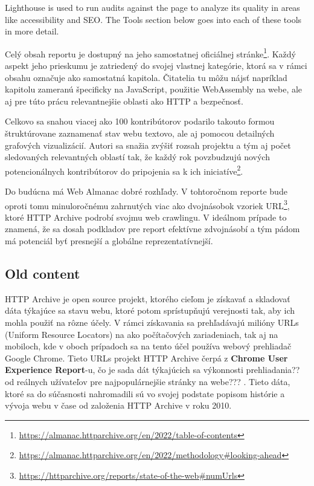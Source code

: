 {
Lighthouse is used to run audits against the page to analyze its quality in areas like accessibility and SEO. The Tools section below goes into each of these tools in more detail.

Celý obsah reportu je dostupný na jeho samostatnej oficiálnej stránke\footnote{\href{https://almanac.httparchive.org/en/2022/table-of-contents}{https://almanac.httparchive.org/en/2022/table-of-contents}}. 
Každý aspekt jeho prieskumu je zatriedený do svojej vlastnej kategórie, ktorá sa v rámci obsahu označuje ako samostatná kapitola.
Čitatelia tu môžu nájsť napríklad kapitolu zameranú špecificky na JavaScript, použitie WebAssembly na webe, ale aj pre túto prácu relevantnejšie oblasti ako HTTP a bezpečnosť.

Celkovo sa snahou viacej ako 100 kontribútorov podarilo takouto formou štruktúrovane zaznamenať stav webu textovo, ale aj pomocou detailných grafových vizualizácií.
Autori sa snažia zvýšiť rozsah projektu a tým aj počet sledovaných relevantných oblastí tak, že každý rok povzbudzujú nových potencionálnych kontribútorov do pripojenia sa k ich iniciatíve\footnote{\href{https://almanac.httparchive.org/en/2022/methodology\#looking-ahead}{https://almanac.httparchive.org/en/2022/methodology\#looking-ahead}}. 

Do budúcna má Web Almanac dobré rozhľady. V tohtoročnom reporte bude oproti tomu minuloročnému zahrnutých viac ako dvojnásobok vzoriek URL\footnote{\href{https://httparchive.org/reports/state-of-the-web\#numUrls}{https://httparchive.org/reports/state-of-the-web\#numUrls}}, ktoré HTTP Archive podrobí svojmu web crawlingu.
V ideálnom prípade to znamená, že sa dosah podkladov pre report efektívne zdvojnásobí a tým pádom má potenciál byť presnejší a globálne reprezentatívnejší.


\subsection{Old content}
HTTP Archive je open source projekt, ktorého cieľom je získavať a skladovať dáta 
týkajúce sa stavu webu, ktoré potom sprístupňujú verejnosti tak, aby ich mohla
použiť na rôzne účely. V rámci získavania sa prehľadávajú milióny URLs (Uniform 
Resource Locators) na ako počítačových zariadeniach, tak aj na mobiloch, kde v oboch prípadoch sa na tento účel používa webový prehliadač Google Chrome. 
 Tieto URLs projekt HTTP Archive čerpá z 
\textbf{Chrome User Experience Report}-u, čo je sada dát týkajúcich sa výkonnosti
prehliadania?? od reálnych užívateľov pre najpopulárnejšie stránky na webe???
. Tieto dáta, ktoré sa do súčasnosti nahromadili sú vo svojej podstate popisom histórie a vývoja webu v čase od založenia HTTP Archive v roku 2010.

}
